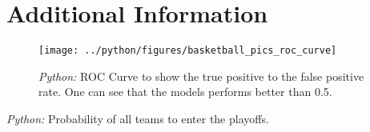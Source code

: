 \documentclass[11pt, a4paper, leqno]{article}
\begin{document}
\section{Additional Information}

\begin{figure}[H]

    \centering
    \texttt{[image: ../python/figures/basketball\_pics\_roc\_curve]}

    \caption{\emph{Python:} ROC Curve to show the true positive to the false positive rate. One can see that the models performs better than 0.5.}
    \label{fig:python-roc_curve}

\end{figure}

\begin{table}[!h]
    
    \caption{\label{tab:python-results_table}\emph{Python:} Probability of all teams to enter the playoffs.}
\end{table}
\printbibliography
{}
\end{document}
